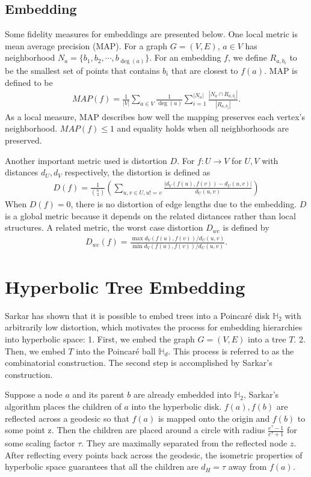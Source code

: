 \subsection{Embedding}
Some fidelity measures for embeddings are presented below. One local metric is mean average precision (MAP). For a graph $G = (V, E)$, $a \in V$ has neighborhood $N_a = \{b_1, b_2, \cdots, b_{\deg(a)}\}$. For an embedding $f$, we define $R_{a, b_i}$ to be the smallest set of points that contains $b_i$ that are closest to $f(a)$. MAP is defined to be 
\begin{align*}
    MAP(f) = \frac{1}{|V|} \sum_{a\in V}\frac{1}{\deg(a)} \sum^{|N_a|}_{i=1}\frac{|N_a \cap R_{a, b_i}|}{|R_{a, b_i}|}.
\end{align*}
As a local measure, MAP describes how well the mapping preserves each vertex's neighborhood. $MAP(f) \leq 1$ and equality holds when all neighborhoods are preserved. 

Another important metric used is distortion $D$. For $f:U\rightarrow V$ for $U, V$ with distances $d_U, d_V$ respectively, the distortion is defined as
\begin{align*}
    D(f) = \frac{1}{\binom{n}{2}}\left(\sum_{u, v \in U, u != v}\frac{|d_V(f(u), f(v)) - d_U(u, v)|}{d_U(u, v)}\right)
\end{align*}
When $D(f) = 0$, there is no distortion of edge lengths due to the embedding. $D$ is a global metric because it depends on the related distances rather than local structures. A related metric, the worst case distortion $D_{wc}$ is defined by
\begin{align*}
    D_{wc}(f) = \frac{\max d_V(f(u), f(v))/d_U(u, v)}{\min d_V(f(u), f(v))/d_U(u, v)}.
\end{align*}


\section{Hyperbolic Tree Embedding}
Sarkar has shown that it is possible to embed trees into a Poincar\'e disk $\mathbb{H}_2$ with arbitrarily low distortion, which motivates the process for embedding hierarchies into hyperbolic space: 1. First, we embed the graph $G = (V, E)$ into a tree $T$. 2. Then, we embed $T$ into the Poincar\'e ball $\mathbb{H}_d$. This process is referred to as the combinatorial construction. The second step is accomplished by Sarkar's construction. 

Suppose a node $a$ and its parent $b$ are already embedded into $\mathbb{H}_2$, Sarkar's algorithm places the children of $a$ into the hyperbolic disk. $f(a), f(b)$ are reflected across a geodesic so that $f(a)$ is mapped onto the origin and $f(b)$ to some point z. Then the children are placed around a circle with radius $\frac{e^\tau - 1}{e^\tau + 1}$ for some scaling factor $\tau$. They are maximally separated from the reflected node $z$. After reflecting every points back across the geodesic, the isometric properties of hyperbolic space guarantees that all the children are $d_H = \tau$ away from $f(a)$. 

